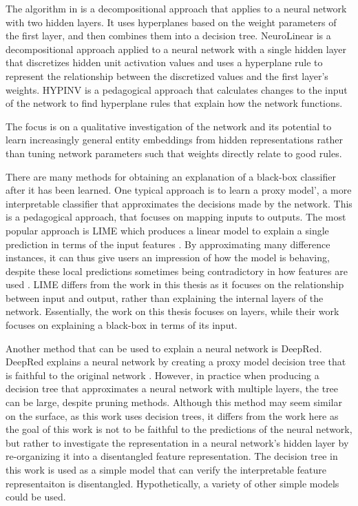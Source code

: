 The algorithm in \cite{Kim2000} is a decompositional approach that applies to a neural network with two hidden layers. It uses hyperplanes based on the weight parameters of the first layer, and then combines them into a decision tree. NeuroLinear \cite{Setiono1997c} is a decompositional approach applied to a neural network with a single hidden layer that discretizes hidden unit activation values and uses a hyperplane rule to represent the relationship between the discretized values and the first layer's weights. HYPINV \cite{Saad2007b} is a pedagogical approach that calculates changes to the input of the network to find hyperplane rules that explain how the network functions. 

 The focus  is on a qualitative investigation of the network and its potential to learn increasingly general entity embeddings from hidden representations rather than tuning network parameters such that weights directly relate to good rules. 

There are many methods for obtaining an explanation of a black-box classifier after it has been learned. One typical approach is to learn a proxy model', a more interpretable classifier that approximates the decisions made by the network. This is a pedagogical approach, that focuses on mapping inputs to outputs. The most popular approach is  LIME which produces a linear model to explain a single prediction in terms of the input features  \cite{Ribeiro2016}. By approximating many difference instances, it can thus give users an impression of how the model is behaving, despite these local predictions sometimes being contradictory in how features are used \cite{Ribeiro2016a}.  LIME differs from the work in this thesis as it focuses on the relationship between input and output, rather than explaining the internal layers of the network. Essentially, the work on this thesis focuses on layers, while their work focuses on explaining a black-box in terms of its input. 

Another method that can be used to explain a neural network is DeepRed. DeepRed explains a neural network by creating a proxy model decision tree that is faithful to the original network \cite{Zilke2016}. However, in practice when producing a decision tree that approximates a neural network with multiple layers, the tree can be large, despite pruning methods. Although this method may seem similar on the surface, as this work uses decision trees, it differs from the work here as the goal of this work is not to be faithful to the predictions of the neural network, but rather to investigate the representation in a neural network's hidden layer by re-organizing it into a disentangled feature representation. The decision tree in this work is used as a simple  model that can verify the interpretable feature representaiton is disentangled. Hypothetically, a variety of other simple  models could be used.

